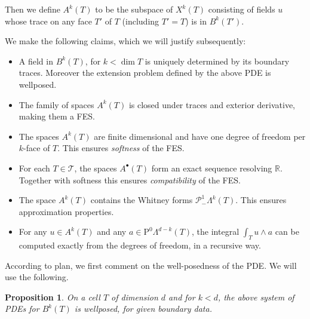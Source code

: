 \documentclass[10pt,a4paper]{article}
\newcommand{\rmP}{\mathrm{P}}
\newcommand{\bbR}{\mathbb{R}}
\newcommand{\calP}{\mathcal{P}}
\newcommand{\calT}{\mathcal{T}}
\newcommand{\bs}{{\scriptscriptstyle{\bullet}}}
\newcommand{\Poly}{\calP}
\newcommand{\Pminus}{\Poly_{\!\!-}}
\newtheorem{proposition}[theorem]{Proposition}
\theoremstyle{remark}
\theoremstyle{definition}
\numberwithin{equation}{section}
\begin{document}
Then we define $A^k(T)$ to be the subspace of $X^k(T)$ consisting of fields $u$ whose trace on any face $T'$ of $T$ (including $T' = T$) is in $B^k(T')$.

We make the following claims, which we will justify subsequently:
\begin{itemize}
\item A field in $B^k(T)$, for $k < \dim T$ is uniquely determined by its boundary traces. Moreover the extension problem defined by the above PDE is wellposed.
\item The family of spaces $A^k(T)$ is closed under traces and exterior derivative, making them a FES.
\item The spaces $A^k(T)$ are finite dimensional and have one degree of freedom per $k$-face of $T$. This ensures \emph{softness} of the FES.
\item For each $T \in \calT$, the spaces $A^\bs(T)$ form an exact sequence resolving $\bbR$. Together with softness this ensures \emph{compatibility} of the FES.
\item The space $A^k(T)$ contains the Whitney forms $\Pminus^1 \Lambda^k(T)$. This ensures approximation properties.
\item For any $u \in A^k(T)$ and any $a \in \rmP^0\Lambda^{d-k}(T)$, the integral $\int_T u \wedge a$ can be computed exactly from the degrees of freedom, in a recursive way.
\end{itemize}


According to plan, we first comment on the well-posedness of the PDE. We will use the following.

\begin{proposition} On a cell $T$ of dimension $d$ and for $k < d$, the above system of PDEs for $B^k(T)$ is wellposed, for given boundary data.
\end{proposition}
\end{document}
